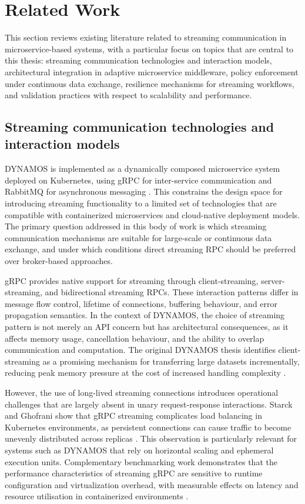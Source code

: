 \section{Related Work}

This section reviews existing literature related to streaming communication in microservice-based systems, with a particular focus on topics that are central to this thesis: streaming communication technologies and interaction models, architectural integration in adaptive microservice middleware, policy enforcement under continuous data exchange, resilience mechanisms for streaming workflows, and validation practices with respect to scalability and performance.

\subsection{Streaming communication technologies and interaction models}

DYNAMOS is implemented as a dynamically composed microservice system deployed on Kubernetes, using gRPC for inter-service communication and RabbitMQ for asynchronous messaging \cite{stutterheim2023thesis,stutterheim2023icsa}. This constrains the design space for introducing streaming functionality to a limited set of technologies that are compatible with containerized microservices and cloud-native deployment models. The primary question addressed in this body of work is which streaming communication mechanisms are suitable for large-scale or continuous data exchange, and under which conditions direct streaming RPC should be preferred over broker-based approaches.

gRPC provides native support for streaming through client-streaming, server-streaming, and bidirectional streaming RPCs. These interaction patterns differ in message flow control, lifetime of connections, buffering behaviour, and error propagation semantics. In the context of DYNAMOS, the choice of streaming pattern is not merely an API concern but has architectural consequences, as it affects memory usage, cancellation behaviour, and the ability to overlap communication and computation. The original DYNAMOS thesis identifies client-streaming as a promising mechanism for transferring large datasets incrementally, reducing peak memory pressure at the cost of increased handling complexity \cite{stutterheim2023thesis}.

However, the use of long-lived streaming connections introduces operational challenges that are largely absent in unary request-response interactions. Starck and Ghofrani show that gRPC streaming complicates load balancing in Kubernetes environments, as persistent connections can cause traffic to become unevenly distributed across replicas \cite{starck2023streaminglb}. This observation is particularly relevant for systems such as DYNAMOS that rely on horizontal scaling and ephemeral execution units. Complementary benchmarking work demonstrates that the performance characteristics of streaming gRPC are sensitive to runtime configuration and virtualization overhead, with measurable effects on latency and resource utilisation in containerized environments \cite{sodankoor2026grpcbench}.

